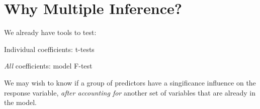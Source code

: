 \documentclass[12pt]{notes}
\begin{document}

\section{Why Multiple Inference?}

We already have tools to test:
\bi
\item Individual coefficients: t-tests
\item \textit{All} coefficients: model F-test
\ei

\nspace


\begin{minipage}[l][2cm][c]{\textwidth}
We may wish to know if a group of predictors have a singificance influence on the response variable, \textit{after accounting for} another set of variables that are already in the model. 
\end{minipage}











\end{document}
